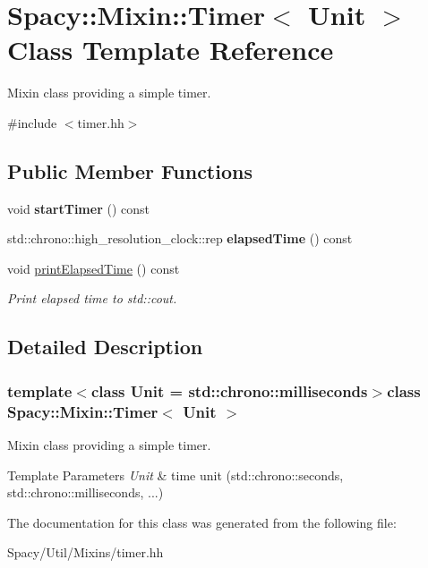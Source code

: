 \hypertarget{classSpacy_1_1Mixin_1_1Timer}{}\section{Spacy\+:\+:Mixin\+:\+:Timer$<$ Unit $>$ Class Template Reference}
\label{classSpacy_1_1Mixin_1_1Timer}


Mixin class providing a simple timer.  




{\ttfamily \#include $<$timer.\+hh$>$}

\subsection*{Public Member Functions}
\begin{DoxyCompactItemize}
\item 
\hypertarget{classSpacy_1_1Mixin_1_1Timer_acf3c292b6d482c7c4ded5f961be4bc4b}{}void {\bfseries start\+Timer} () const \label{classSpacy_1_1Mixin_1_1Timer_acf3c292b6d482c7c4ded5f961be4bc4b}

\item 
\hypertarget{classSpacy_1_1Mixin_1_1Timer_ab27a20d8e1e9bc90ea56cb18ff752798}{}std\+::chrono\+::high\+\_\+resolution\+\_\+clock\+::rep {\bfseries elapsed\+Time} () const \label{classSpacy_1_1Mixin_1_1Timer_ab27a20d8e1e9bc90ea56cb18ff752798}

\item 
\hypertarget{classSpacy_1_1Mixin_1_1Timer_a3b79b35213702118d0823f6040d5a315}{}void \hyperlink{classSpacy_1_1Mixin_1_1Timer_a3b79b35213702118d0823f6040d5a315}{print\+Elapsed\+Time} () const \label{classSpacy_1_1Mixin_1_1Timer_a3b79b35213702118d0823f6040d5a315}

\begin{DoxyCompactList}\small\item\em Print elapsed time to std\+::cout. \end{DoxyCompactList}\end{DoxyCompactItemize}


\subsection{Detailed Description}
\subsubsection*{template$<$class Unit = std\+::chrono\+::milliseconds$>$class Spacy\+::\+Mixin\+::\+Timer$<$ Unit $>$}

Mixin class providing a simple timer. 


\begin{DoxyTemplParams}{Template Parameters}
{\em Unit} & time unit (std\+::chrono\+::seconds, std\+::chrono\+::milliseconds, ...) \\
\hline
\end{DoxyTemplParams}


The documentation for this class was generated from the following file\+:\begin{DoxyCompactItemize}
\item 
Spacy/\+Util/\+Mixins/timer.\+hh\end{DoxyCompactItemize}
